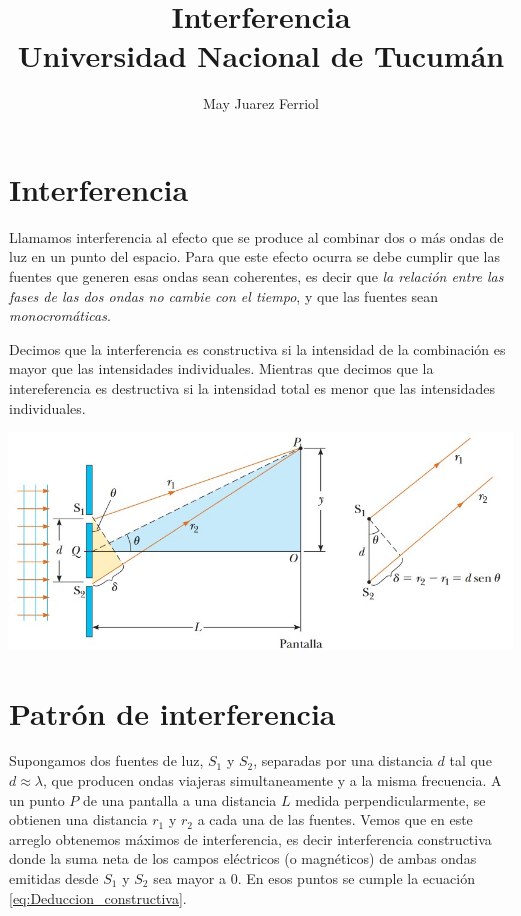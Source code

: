 \documentclass[a4paper,12pt]{article}
\title{ Interferencia \\ 
\medskip \large Universidad Nacional de Tucumán}
\author{May Juarez Ferriol}
\date{}
\newenvironment{Figure}
  {\par\medskip\noindent\minipage{\linewidth}}
  {\endminipage\par\medskip}
\begin{document}
\maketitle

\section*{Interferencia}

    Llamamos interferencia al efecto que se produce al combinar dos o más ondas de luz en un punto del espacio. Para que este efecto ocurra se debe cumplir que las fuentes que generen esas ondas sean coherentes, es decir que \emph{la relación entre las fases de las dos ondas no cambie con el tiempo}, y que las fuentes sean \emph{monocromáticas}.

    Decimos que la interferencia es constructiva si la intensidad de la combinación es mayor que las intensidades individuales. Mientras que decimos que la intereferencia es destructiva si la intensidad total es menor que las intensidades individuales.

    \begin{Figure}
        \centering
        \includegraphics[width=0.75\linewidth]{DeduccionInterferencia.jpg}
        \label{fig:DeduccionInterferencia}
    \end{Figure}

\section*{Patrón de interferencia}

    Supongamos dos fuentes de luz, $S_1$ y $S_2$, separadas por una distancia $d$ tal que $d \approx \lambda$, que producen ondas viajeras simultaneamente y a la misma frecuencia. A un punto $P$ de una pantalla a una distancia $L$ medida perpendicularmente, se obtienen una distancia $r_1$ y $r_2$ a cada una de las fuentes. Vemos que en este arreglo obtenemos máximos de interferencia, es decir interferencia constructiva donde la suma neta de los campos eléctricos (o magnéticos) de ambas ondas emitidas desde $S_1$ y $S_2$ sea mayor a 0. En esos puntos se cumple la ecuación \ref{eq:Deduccion_constructiva}.
\end{document}
